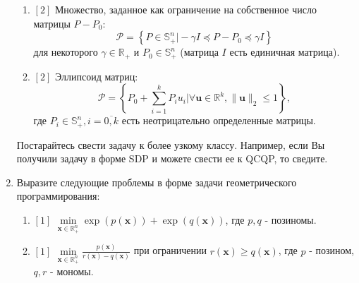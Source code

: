 \documentclass{article}
\begin{document}
\begin{enumerate}
\begin{enumerate}[label=\alph*)]
        \item $[2]$ Множество, заданное как ограничение на собственное число матрицы $P-P_0$: $$\mathcal{P}=\left\{P\in\mathbb{S}^n_+\Big|-\gamma I \preceq P - P_0 \preceq \gamma I\right\}$$
        для некоторого $\gamma \in\mathbb{R}_+$ и $P_0\in\mathbb{S}^n_+$ (матрица $I$ есть единичная матрица).
        
        \item $[2]$ Эллипсоид матриц:
        $$\mathcal{P}=\left\{P_0+\sum\limits_{i=1}^k P_i u_i\Big| \forall \mathbf{u}\in\mathbb{R}^k, \|\mathbf{u}\|_2\leq 1 \right\},$$
        где $P_i\in\mathbb{S}^n_+,i=\overline{0,k}$ есть неотрицательно определенные матрицы.
    \end{enumerate}
    
    Постарайтесь свести задачу к более узкому классу. Например, если Вы получили задачу в форме SDP и можете свести ее к QCQP, то сведите.
    
    \item  Выразите следующие проблемы в форме задачи геометрического программирования:
    \begin{enumerate}[label=\alph*)]
        \item $[1]$ $\min\limits_{\mathbf{x}\in\mathbb{R}^n_+}\exp(p(\mathbf{x}))+\exp(q(\mathbf{x}))$, где $p,q$ - позиномы.
        \item $[1]$ $\min\limits_{\mathbf{x}\in\mathbb{R}^n_+}\frac{p(\mathbf{x})}{r(\mathbf{x})-q(\mathbf{x})}$ при ограничении $r(\mathbf{x})\geq q(\mathbf{x})$, где $p$ - позином, $q,r$ - мономы.
    \end{enumerate}


\end{enumerate}
\end{document}
